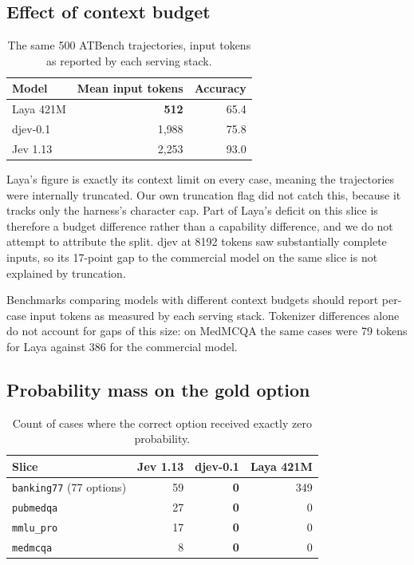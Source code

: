 \subsection{Effect of context budget}

\begin{table}[t]
\centering
\caption{The same 500 ATBench trajectories, input tokens as reported by each serving stack.}
\label{tab:context}
\small
\begin{tabular}{lrr}
\toprule
Model & Mean input tokens & Accuracy \\
\midrule
Laya 421M & \textbf{512} & 65.4 \\
djev-0.1  & 1{,}988 & 75.8 \\
Jev 1.13  & 2{,}253 & 93.0 \\
\bottomrule
\end{tabular}
\end{table}

Laya's figure is exactly its context limit on every case, meaning the trajectories were internally truncated. Our own truncation flag did not catch this, because it tracks only the harness's character cap. Part of Laya's deficit on this slice is therefore a budget difference rather than a capability difference, and we do not attempt to attribute the split. djev at 8192 tokens saw substantially complete inputs, so its 17-point gap to the commercial model on the same slice is not explained by truncation.

Benchmarks comparing models with different context budgets should report per-case input tokens as measured by each serving stack. Tokenizer differences alone do not account for gaps of this size: on MedMCQA the same cases were 79 tokens for Laya against 386 for the commercial model.

\subsection{Probability mass on the gold option}
\label{sec:zeromass}

\begin{table}[t]
\centering
\caption{Count of cases where the correct option received exactly zero probability.}
\label{tab:zeromass}
\small
\begin{tabular}{lrrr}
\toprule
Slice & Jev 1.13 & djev-0.1 & Laya 421M \\
\midrule
\texttt{banking77} (77 options) & 59 & \textbf{0} & 349 \\
\texttt{pubmedqa}  & 27 & \textbf{0} & 0 \\
\texttt{mmlu\_pro} & 17 & \textbf{0} & 0 \\
\texttt{medmcqa}   &  8 & \textbf{0} & 0 \\
\bottomrule
\end{tabular}
\end{table}

